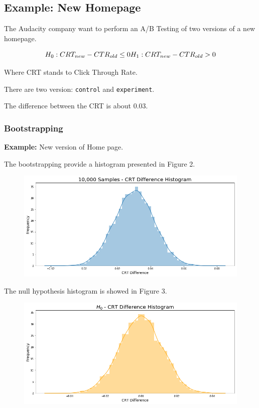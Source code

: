 \documentclass[]{book}
\begin{document}
\subsection{Example: New Homepage}\label{example-new-homepage}

The Audacity company want to perform an A/B Testing of two versions of a
new homepage.

\[H_0 : CRT_{new} - CTR_{old} \leq 0 \\
  H_1 : CRT_{new} - CTR_{old} > 0\]

Where CRT stands to Click Through Rate.

There are two version: \texttt{control} and \texttt{experiment}.

The difference between the CRT is about 0.03.

\subsubsection*{Bootstrapping}\label{bootstrapping-1}

\textbf{Example:} New version of Home page.

The bootstrapping provide a histogram presented in Figure 2.

\begin{figure}
\centering
\includegraphics{01-img/c4_l13_02.png}
\caption{}
\end{figure}

The null hypothesis histogram is showed in Figure 3.

\begin{figure}
\centering
\includegraphics{01-img/c4_l13_03.png}
\caption{}
\end{figure}
\end{document}
